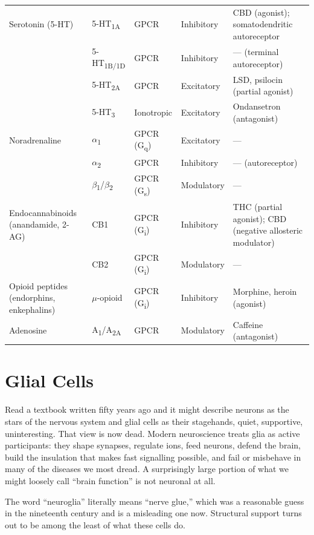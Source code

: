 \documentclass[11pt]{article}
\begin{document}
{\begin{longtable}{p{2.8cm} p{2.4cm} p{1.8cm} p{1.9cm} p{4.0cm}}
Serotonin (5-HT) & 5-HT\textsubscript{1A} & GPCR & Inhibitory & CBD (agonist); somatodendritic autoreceptor \\
 & 5-HT\textsubscript{1B/1D} & GPCR & Inhibitory & --- (terminal autoreceptor) \\
 & 5-HT\textsubscript{2A} & GPCR & Excitatory & LSD, psilocin (partial agonist) \\
 & 5-HT\textsubscript{3} & Ionotropic & Excitatory & Ondansetron (antagonist) \\
\midrule
Noradrenaline & $\alpha$\textsubscript{1} & GPCR (G\textsubscript{q}) & Excitatory & --- \\
 & $\alpha$\textsubscript{2} & GPCR & Inhibitory & --- (autoreceptor) \\
 & $\beta$\textsubscript{1}/$\beta$\textsubscript{2} & GPCR (G\textsubscript{s}) & Modulatory & --- \\
\midrule
Endocannabinoids (anandamide, 2-AG) & CB1 & GPCR (G\textsubscript{i}) & Inhibitory & THC (partial agonist); CBD (negative allosteric modulator) \\
 & CB2 & GPCR (G\textsubscript{i}) & Modulatory & --- \\
\midrule
Opioid peptides (endorphins, enkephalins) & $\mu$-opioid & GPCR (G\textsubscript{i}) & Inhibitory & Morphine, heroin (agonist) \\
\midrule
Adenosine & A\textsubscript{1}/A\textsubscript{2A} & GPCR & Modulatory & Caffeine (antagonist) \\
\end{longtable}
}

\section{Glial Cells}

Read a textbook written fifty years ago and it might describe neurons as the stars of the nervous system and glial cells as their stagehands, quiet, supportive, uninteresting. That view is now dead. Modern neuroscience treats glia as active participants: they shape synapses, regulate ions, feed neurons, defend the brain, build the insulation that makes fast signalling possible, and fail or misbehave in many of the diseases we most dread. A surprisingly large portion of what we might loosely call ``brain function'' is not neuronal at all.

The word ``neuroglia'' literally means ``nerve glue,'' which was a reasonable guess in the nineteenth century and is a misleading one now. Structural support turns out to be among the least of what these cells do.
\end{document}
